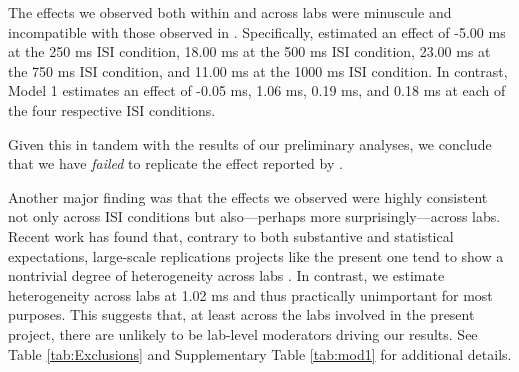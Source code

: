\documentclass[A4paper,man,floatsintext]{apa6}
\theoremstyle{definition}
\theoremstyle{definition}
\theoremstyle{definition}
\theoremstyle{remark}
\begin{document}
The effects we observed both within and across labs were minuscule and
incompatible with those observed in \textcite{Fischer:2003ju}.
Specifically, \textcite{Fischer:2003ju} estimated an effect of -5.00 ms
at the 250 ms ISI condition, 18.00 ms at the 500 ms ISI condition, 23.00
ms at the 750 ms ISI condition, and 11.00 ms at the 1000 ms ISI
condition. In contrast, Model 1 estimates an effect of -0.05 ms, 1.06
ms, 0.19 ms, and 0.18 ms at each of the four respective ISI conditions.

Given this in tandem with the results of our preliminary analyses, we
conclude that we have \emph{failed} to replicate the effect reported by
\textcite{Fischer:2003ju}.

Another major finding was that the effects we observed were highly
consistent not only across ISI conditions but also---perhaps more
surprisingly---across labs. Recent work has found that, contrary to both
substantive and statistical expectations, large-scale replications
projects like the present one tend to show a nontrivial degree of
heterogeneity across labs \autocite{mcshane2019b}. In contrast, we
estimate heterogeneity across labs at 1.02 ms and thus practically
unimportant for most purposes. This suggests that, at least across the
labs involved in the present project, there are unlikely to be lab-level
moderators driving our results. See Table \ref{tab:Exclusions} and
Supplementary Table \ref{tab:mod1} for additional details.
\end{document}
